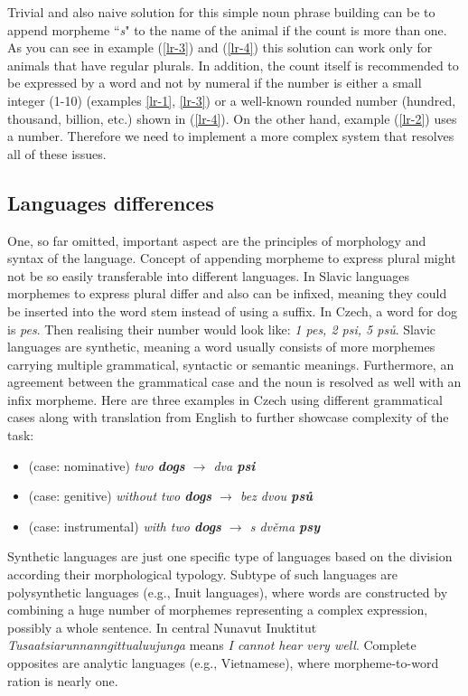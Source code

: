 Trivial and also naive solution for this simple noun phrase building can be to append morpheme ``\textit{s}" to the name of the animal if the count is more than one. As you can see in example (\ref{lr-3}) and (\ref{lr-4}) this solution can work only for animals that have regular plurals. In addition, the count itself is recommended to be expressed by a word and not by numeral if the number is either a small integer (1-10) (examples \ref{lr-1}, \ref{lr-3}) or a well-known rounded number (hundred, thousand, billion, etc.) shown in (\ref{lr-4}). On the other hand, example (\ref{lr-2}) uses a number. Therefore we need to implement a more complex system that resolves all of these issues.

\subsection{Languages differences}
One, so far omitted, important aspect are the principles of morphology and syntax of the language. Concept of appending morpheme to express plural might not be so easily transferable into different languages. In Slavic languages morphemes to express plural differ and also can be infixed, meaning they could be inserted into the word stem instead of using a suffix. In Czech, a word for dog is \emph{pes}. Then realising their number would look like: \emph{1 pes, 2 psi, 5 psů}. Slavic languages are synthetic, meaning a word usually consists of more morphemes carrying multiple grammatical, syntactic or semantic meanings. Furthermore, an agreement between the grammatical case and the noun is resolved as well with an infix morpheme. Here are three examples in Czech using different grammatical cases along with translation from English to further showcase complexity of the task:

\begin{itemize}
	\item (case: nominative) \emph{two \textbf{dogs}	$\rightarrow$ dva \textbf{psi}}
	\item (case: genitive) 	\emph{without two \textbf{dogs}  $\rightarrow$ bez dvou \textbf{psů}}
	\item (case: instrumental) \emph{with two \textbf{dogs} 	$\rightarrow$ s dvěma \textbf{psy}}
\end{itemize}

Synthetic languages are just one specific type of languages based on the division according their morphological typology. Subtype of such languages are polysynthetic languages (e.g., Inuit languages), where words are constructed by combining a huge number of morphemes representing a complex expression, possibly a whole sentence. In central Nunavut Inuktitut \emph{Tusaatsiarunnanngittualuujunga} means \emph{I cannot hear very well}. Complete opposites are analytic languages (e.g., Vietnamese), where morpheme-to-word ration is nearly one. 

